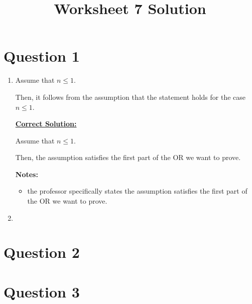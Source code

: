\documentclass[12pt]{article}
\begin{document}
\title{Worksheet 7 Solution}
\maketitle

\section*{Question 1}
\begin{enumerate}
    \item

    Assume that $n \leq 1$.

    \bigskip

    Then, it follows from the assumption that the statement holds for the case
    $n \leq 1$.

    \begin{mdframed}
        \underline{\textbf{Correct Solution:}}

        Assume that $n \leq 1$.

        \bigskip

        Then, the assumption satisfies the first part of the OR we want to prove.

    \end{mdframed}

    \bigskip

    \textbf{Notes:}
    \begin{itemize}
        \item the professor specifically states the assumption satisfies the first
        part of the OR we want to prove.

    \end{itemize}

    \item



\end{enumerate}

\section*{Question 2}

\section*{Question 3}
\end{document}
